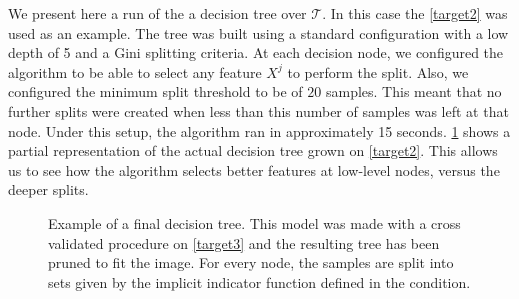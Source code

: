 We present here a run of the a decision tree over $\mathcal{T}$.
In this case the \cref{target2} was used as an example.
The tree was built using a standard configuration with a low depth of 5 and a Gini splitting criteria.
At each decision node, we configured the algorithm to be able to select any feature $X^j$ to perform the split.
Also, we configured the minimum split threshold to be of $20$ samples.
This meant that no further splits were created when less than this number of samples was left at that node.
Under this setup, the algorithm ran in approximately 15 seconds.
\cref{fig:decision_tree_actual_problem} shows a partial representation of the actual decision tree grown on \cref{target2}.
This allows us to see how the algorithm selects better features at low-level nodes, versus the deeper splits.

\bigskip

\begin{figure}
	\centering
	\caption{ Example of a final decision tree.
		This model was made with a cross validated procedure on \cref{target3} and the resulting tree has been pruned to fit the image.
		For every node, the samples are split into sets given by the implicit indicator function defined in the condition.}
	\label{fig:decision_tree_actual_problem}
\end{figure}




